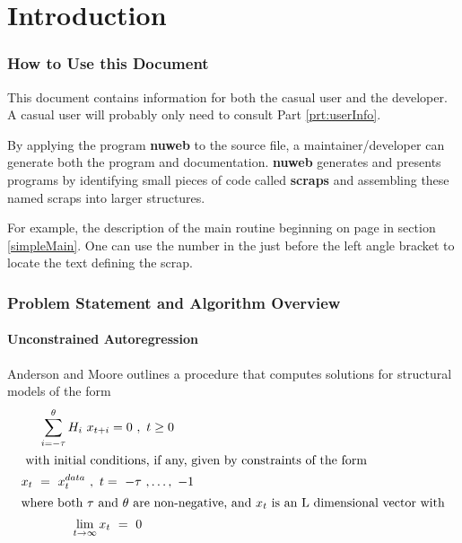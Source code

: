 \documentclass{article}
\begin{document}
\newpage
{}
\part{Introduction}
\section{How to Use this Document}
\label{sec:how}
This document contains information for both the casual user and the developer.
A casual user will probably only need to consult Part \ref{prt:userInfo}.

By applying the program {\bf nuweb} to the source file,
 a maintainer/developer can generate
both the program and documentation.
{\bf nuweb } generates and presents programs by identifying small pieces
of code called {\bf scraps} and assembling these named scraps into
larger structures.

For example, the description of the main routine beginning 
on page \pageref{simpleMain}
in section \ref{simpleMain}.
One can use the number in the just before the left angle bracket to locate
the text defining the scrap.






\section{Problem Statement and Algorithm Overview}

\subsection{Unconstrained Autoregression}
\label{sec:unconstrainedar}


Anderson and Moore \cite{ANDER:AIM2} outlines a procedure that computes solutions for structural models of the form
\begin{gather}
\sum_{i= - \tau}^\theta { H_i ~ x_{ t + i } }= 0~,~ t \geq 0 \label{eq:canonical}\\ \intertext{ with initial conditions, if any, given by constraints of the form}
x_t ~ = ~ x^{data}_t ~ , ~ t = ~ - \tau~, \ldots ,~ -1\\ \intertext{where both $\tau$ and $\theta$ are non-negative, and $x_t$ is an L dimensional vector with}
\lim_{ t \rightarrow \infty } x_t ~ = ~ 0
\end{gather}
\end{document}
